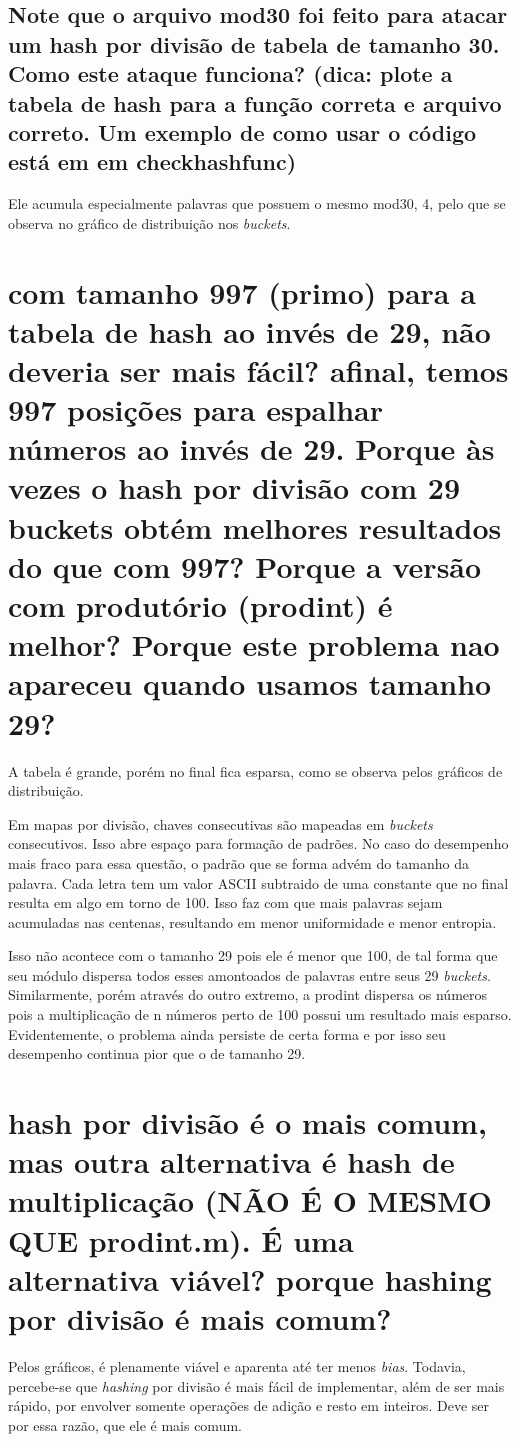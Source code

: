 \documentclass{article}[twocolumn]
\begin{document}
	\subsection{Note que o arquivo mod30 foi feito para atacar um hash por divisão de tabela de
	tamanho 30.  Como este ataque funciona?  (dica: plote a tabela de hash para a função
	correta e arquivo correto. Um exemplo de como usar o código está em em checkhashfunc)}
	Ele acumula especialmente
	palavras que possuem o mesmo mod30, 4, pelo que se observa no gr\'afico de
	distribui\c{c}\~ao nos \textit{buckets}.
	\section{com tamanho 997 (primo) para a tabela de hash ao invés de 29, não deveria ser
	mais fácil?  afinal, temos 997 posições para espalhar números ao invés de 29.  Porque às vezes o
	hash por divisão com 29 buckets obtém melhores resultados do que com 997? Porque a versão com
	produtório (prodint) é melhor? Porque este problema nao apareceu quando usamos tamanho 29?}
	A tabela \'e grande, por\'em no final fica esparsa, como se observa pelos gr\'aficos
	de distribui\c{c}\~ao.

	Em mapas por divis\~ao, chaves consecutivas s\~ao mapeadas em \textit{buckets}
	consecutivos. Isso abre espa\c{c}o para forma\c{c}\~ao de padr\~oes. No caso
	do desempenho mais fraco para essa quest\~ao, o padr\~ao que se forma adv\'em do
	tamanho da palavra. Cada letra tem um valor ASCII subtraido de uma constante que
	no final resulta em algo em torno de 100. Isso faz com que mais palavras sejam
	acumuladas nas centenas, resultando em menor uniformidade e menor entropia.

	Isso n\~ao acontece com o tamanho 29 pois ele \'e menor que 100, de tal forma que
	seu m\'odulo dispersa todos esses amontoados de palavras entre seus 29
	\textit{buckets}. Similarmente, por\'em atrav\'es do outro extremo, a prodint
	dispersa os n\'umeros pois a multiplica\c{c}\~ao de n n\'umeros perto de 100 possui
	um resultado mais esparso. Evidentemente, o problema ainda persiste de certa forma
	e por isso seu desempenho continua pior que o de tamanho 29.
	
	\section{hash por divisão é o mais comum, mas outra alternativa é hash de multiplicação (NÃO
	É O MESMO QUE prodint.m). É uma alternativa viável? porque hashing por divisão é mais comum?}
	Pelos gr\'aficos, \'e plenamente vi\'avel e aparenta at\'e ter menos \textit{bias}. Todavia,
	percebe-se que \textit{hashing} por divis\~ao \'e mais f\'acil de implementar, al\'em de
	ser mais r\'apido, por envolver somente opera\c{c}\~oes de adi\c{c}\~ao e resto em
	inteiros. Deve ser por essa raz\~ao, que ele \'e mais comum.
\end{document}

